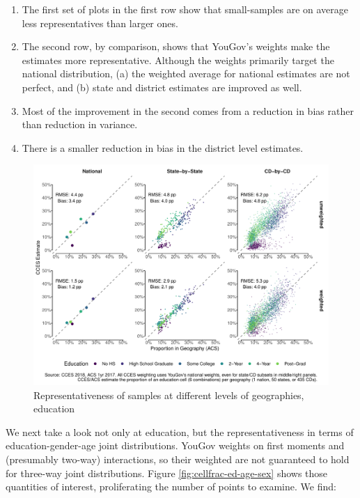 \documentclass[11pt]{article}
\begin{document}
\begin{enumerate}
\item The first set of plots in the first row show that small-samples are on average less representatives than larger ones.
\item The second row, by comparison, shows that YouGov's weights make the estimates more representative. Although the weights primarily target the national distribution, (a) the weighted average for national estimates are not perfect, and (b) state and district estimates are improved as well. 
\item Most of the improvement in the second comes from a reduction in bias rather than reduction in variance. 
\item There is a smaller reduction in bias in the district level estimates.
\end{enumerate}

\begin{figure}[tbph]
\caption{Representativeness of samples at different levels of geographies, education \label{fig:cellfrac-ed}}
\centering
\includegraphics[width = \textwidth]{figures/educfrac-comparisons.pdf}
\end{figure}

\FloatBarrier

We next take a look not only at education, but the representativeness in terms of education-gender-age joint distributions. YouGov weights on first moments and (presumably two-way) interactions, so their weighted are not guaranteed to hold for three-way joint distributions.  Figure \ref{fig:cellfrac-ed-age-sex} shows those quantities of interest, proliferating the number of points to examine. We find:
\end{document}
